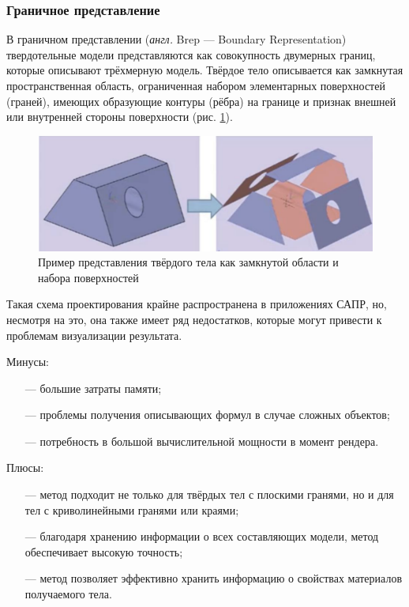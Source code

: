 \subsubsection{Граничное представление}
В граничном представлении (\textit{англ.} Brep --- Boundary Representation) \cite{brep} твердотельные модели представляются как совокупность 
двумерных границ, которые описывают трёхмерную модель. 
Твёрдое тело описывается как замкнутая пространственная область, ограниченная набором элементарных поверхностей (граней), имеющих образующие контуры (рёбра) на границе и признак внешней или внутренней стороны поверхности (рис. \ref{fig:brep}). \newpage

\begin{figure}[h]
	\centering
	\captionsetup{justification=centering}
	\includegraphics[width=\textwidth]{img/brep.png}
	\caption{Пример представления твёрдого тела как замкнутой области и набора поверхностей}
	\label{fig:brep}
\end{figure}

Такая схема проектирования крайне распространена в приложениях 
САПР, но, несмотря на это, она также имеет ряд недостатков, которые могут 
привести к проблемам визуализации результата.

Минусы:
\begin{itemize}[leftmargin=1.6\parindent]
	\item[---] большие затраты памяти;
	\item[---] проблемы получения описывающих формул в случае сложных объектов;
	\item[---] потребность в большой вычислительной мощности в момент рендера.
\end{itemize}

Плюсы:
\begin{itemize}[leftmargin=1.6\parindent]
	\item[---] метод подходит не только для твёрдых тел с плоскими гранями, но и для 
	тел с криволинейными гранями или краями;
	\item[---] благодаря хранению информации о всех составляющих модели, метод 
	обеспечивает высокую точность;
	\item[---] метод позволяет эффективно хранить информацию о свойствах материалов получаемого тела.
\end{itemize}

